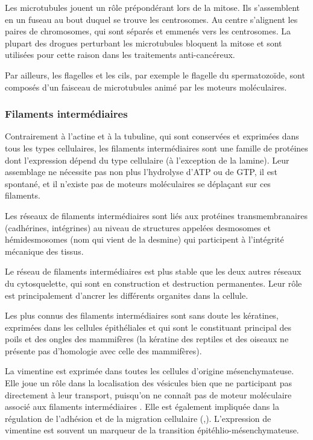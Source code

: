 Les microtubules jouent un rôle prépondérant lors de la mitose. Ils s'assemblent en un fuseau au bout duquel se trouve les centrosomes. Au centre s'alignent les paires de chromosomes, qui sont séparés et emmenés vers les centrosomes. La plupart des drogues perturbant les microtubules bloquent la mitose et sont utilisées pour cette raison dans les traitements anti-cancéreux. 

Par ailleurs, les flagelles et les cils, par exemple le flagelle du spermatozoïde, sont composés d'un faisceau de microtubules animé par les moteurs moléculaires. 

\subsubsection{Filaments intermédiaires}

Contrairement à l'actine et à la tubuline, qui sont conservées et exprimées dans tous les types cellulaires, les filaments intermédiaires sont une famille de protéines dont l'expression dépend du type cellulaire (à l'exception de la lamine). 
Leur assemblage ne nécessite pas non plus l'hydrolyse d'ATP ou de GTP, il est spontané, et il n'existe pas de moteurs moléculaires se déplaçant sur ces filaments. 

Les réseaux de filaments intermédiaires sont liés aux protéines transmembranaires (cadhérines, intégrines) au niveau de structures appelées desmosomes et hémidesmosomes (nom qui vient de la desmine) qui participent à l'intégrité mécanique des tissus. 

Le réseau de filaments intermédiaires est plus stable que les deux autres réseaux du cytosquelette, qui sont en construction et destruction permanentes. Leur rôle est principalement d'ancrer les différents organites dans la cellule. 

Les plus connus des filaments intermédiaires sont sans doute les kératines, exprimées dans les cellules épithéliales et qui sont le constituant principal des poils et des ongles des mammifères (la kératine des reptiles et des oiseaux ne présente pas d'homologie avec celle des mammifères). 

La vimentine est exprimée dans toutes les cellules d'origine mésenchymateuse. Elle joue un rôle dans la localisation des vésicules bien que ne participant pas directement à leur transport, puisqu'on ne connaît pas de moteur moléculaire associé aux filaments intermédiaires  \parencite{styers_intermediate_2005}. Elle est également impliquée dans la régulation de l'adhésion et de la migration cellulaire  (\cite{lynch_endoplasmic_2013},\cite{helfand_vimentin_2011}). 
L'expression de vimentine est souvent un marqueur de la transition épitéhlio-mésenchymateuse. 

